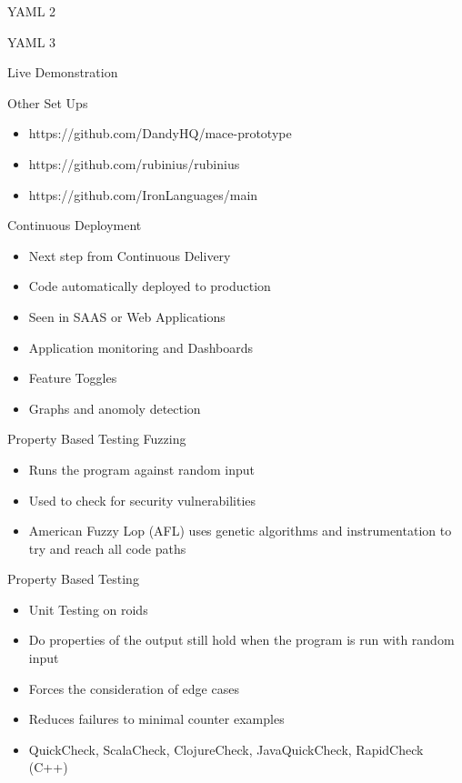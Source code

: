 \documentclass{beamer}
\begin{document}
\begin{frame}{YAML 2}
	\lstII
\end{frame}


\begin{frame}{YAML 3}
	\lstIII
\end{frame}

\begin{frame}{Live Demonstration}
\end{frame}

\begin{frame}{Other Set Ups}
	\begin{itemize}
		\item https://github.com/DandyHQ/mace-prototype
		\item https://github.com/rubinius/rubinius
		\item https://github.com/IronLanguages/main
	\end{itemize}
\end{frame}

\begin{frame}{Continuous Deployment}
	\begin{itemize}
		\item Next step from Continuous Delivery
		\item Code automatically deployed to production
		\item Seen in SAAS or Web Applications
		\item Application monitoring and Dashboards
		\item Feature Toggles
		\item Graphs and anomoly detection
	\end{itemize}
\end{frame}

\begin{frame}{Property Based Testing}
	Fuzzing
	\begin{itemize}
		\item Runs the program against random input
		\item Used to check for security vulnerabilities
		\item American Fuzzy Lop (AFL) uses genetic algorithms and instrumentation to try and reach all code paths
	\end{itemize}
	Property Based Testing
	\begin{itemize}
		\item Unit Testing on roids
		\item Do properties of the output still hold when the program is run with random input
		\item Forces the consideration of edge cases
		\item Reduces failures to minimal counter examples
		\item QuickCheck, ScalaCheck, ClojureCheck, JavaQuickCheck, RapidCheck (C++)
	\end{itemize}
\end{frame}
\end{document}
